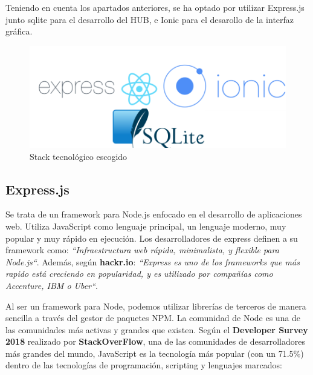 Teniendo en cuenta los apartados anteriores, se ha optado por utilizar Express.js junto sqlite para el desarrollo del HUB, e Ionic para el desarollo de
la interfaz gráfica.

\begin{figure}[H]
\centering
\includegraphics[width=5.00in]{images/stack_tecnologico.png}
\caption{Stack tecnológico escogido}
\label{fig:stack_teconologico}
\end{figure}

\subsection{Express.js}
Se trata de un framework para Node.js enfocado en el desarrollo de aplicaciones web. Utiliza JavaScript como lenguaje principal, un lenguaje moderno, muy popular y
muy rápido en ejecución. Los desarrolladores de express definen a su framework como: \textit{``Infraestructura web rápida, minimalista, y flexible para Node.js``}.
Además, según \textbf{hackr.io}: \textit{``Express es uno de los frameworks que más rapido está creciendo en popularidad, y es utilizado por compañías como Accenture, IBM o
Uber``}.
\par
Al ser un framework para Node, podemos utilizar librerías de terceros de manera sencilla a través del gestor de paquetes NPM. La comunidad de Node es una de las comunidades más activas
y grandes que existen.
\newpage
Según el \textbf{Developer Survey 2018} realizado por \textbf{StackOverFlow}, una de las comunidades de desarrolladores más grandes del mundo, JavaScript es la tecnología
 más popular (con un 71.5\%) dentro de las tecnologías de programación, scripting y lenguajes marcados:

